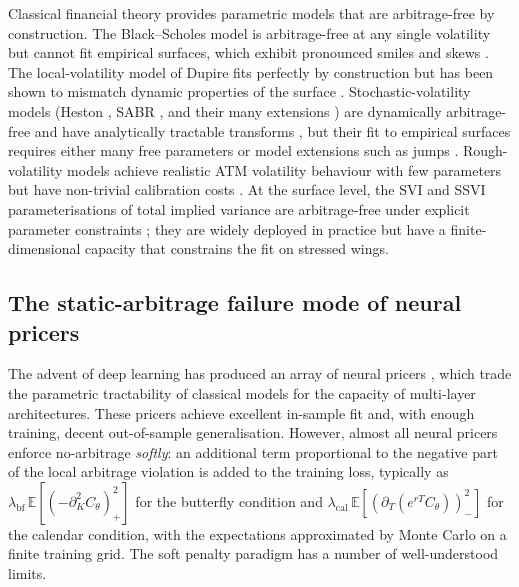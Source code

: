 \documentclass[largeformat]{interact}
\let\cite\citep   %
\theoremstyle{plain}
\theoremstyle{definition}
\newcommand{\E}{\mathbb{E}}
\newcommand{\bs}{Black--Scholes}
\begin{document}
Classical financial theory provides parametric models that are arbitrage-free by construction. The \bs{} model \cite{black1973pricing} is arbitrage-free at any single volatility but cannot fit empirical surfaces, which exhibit pronounced smiles and skews \cite{cont2002empirical,rebonato1999volatility}. The local-volatility model of Dupire \cite{dupire1994pricing} fits perfectly by construction but has been shown to mismatch dynamic properties of the surface \cite{cont2002dynamics,hagan2002managing}. Stochastic-volatility models (Heston \cite{heston1993closed}, SABR \cite{hagan2002managing}, and their many extensions \cite{andersen2007moment}) are dynamically arbitrage-free and have analytically tractable transforms \cite{lewis2001simple,carr1999fourier,eberlein2010analysis}, but their fit to empirical surfaces requires either many free parameters \cite{andersen2010interest} or model extensions such as jumps \cite{carr2002fine,cont2003financial}. Rough-volatility models \cite{alos2007short,bayer2016pricing,bayer2023primer,bennedsen2017hybrid,euch2018perfect} achieve realistic ATM volatility behaviour with few parameters but have non-trivial calibration costs \cite{horvath2021deepvol}. At the surface level, the SVI \cite{gatheral2004parsimonious} and SSVI \cite{gatheral2014arbitrage} parameterisations of total implied variance are arbitrage-free under explicit parameter constraints \cite{jacquier2014arbitrage,gatheral2018volatility}; they are widely deployed in practice but have a finite-dimensional capacity that constrains the fit on stressed wings.

\subsection{The static-arbitrage failure mode of neural pricers}
\label{sec:failure-mode}

The advent of deep learning has produced an array of neural pricers \cite{ackerer2020deep,chataigner2020deep,horvath2021deep,ruf2020neural,ruf2019neural,hutchinson1994nonparametric,itkin2019deep,sirignano2017deep,sirignano2018universal,liu2019pricing,ferguson2018deeply}, which trade the parametric tractability of classical models for the capacity of multi-layer architectures. These pricers achieve excellent in-sample fit and, with enough training, decent out-of-sample generalisation. However, almost all neural pricers enforce no-arbitrage \emph{softly}: an additional term proportional to the negative part of the local arbitrage violation is added to the training loss, typically as $\lambda_{\mathrm{bf}}\,\E[(-\partial^2_K C_\theta)_+^2]$ for the butterfly condition and $\lambda_{\mathrm{cal}}\,\E[(\partial_T (e^{rT}C_\theta))_-^2]$ for the calendar condition, with the expectations approximated by Monte Carlo on a finite training grid. The soft penalty paradigm has a number of well-understood limits.
\end{document}
